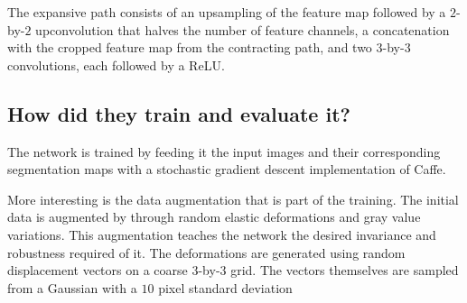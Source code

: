 The expansive path consists of an upsampling of the feature map followed by a
$2$-by-$2$ upconvolution that halves the number of feature channels, a
concatenation with the cropped feature map from the contracting path, and two
$3$-by-$3$ convolutions, each followed by a ReLU.

\subsection*{How did they train and evaluate it?}
The network is trained by feeding it the input images and their corresponding
segmentation maps with a stochastic gradient descent implementation of Caffe.

More interesting is the data augmentation that is part of the training. The
initial data is augmented by through random elastic deformations and gray value
variations. This augmentation teaches the network the desired invariance and
robustness required of it. The deformations are generated using random
displacement vectors on a coarse $3$-by-$3$ grid. The vectors themselves are
sampled from a Gaussian with a $10$ pixel standard deviation












